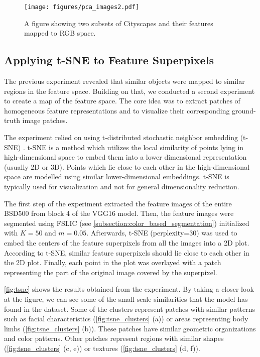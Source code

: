 \begin{figure}[htbp]
    \centering
    \texttt{[image: figures/pca\_images2.pdf]}
    \caption{A figure showing two subsets of Cityscapes and their features mapped to RGB space.}
    \label{fig:pca_images2}
\end{figure}

\subsection{Applying t-SNE to Feature Superpixels}

The previous experiment revealed that similar objects were mapped to similar regions in the feature space. Building on that, we conducted a second experiment to create a map of the feature space. The core idea was to extract patches of homogeneous feature representations and to visualize their corresponding ground-truth image patches.

The experiment relied on using t-distributed stochastic neighbor embedding (t-SNE) \parencite{van2008visualizing}. t-SNE is a method which utilizes the local similarity of points lying in high-dimensional space to embed them into a lower dimensional representation (usually 2D or 3D). Points which lie close to each other in the high-dimensional space are modelled using similar lower-dimensional embeddings. t-SNE is typically used for visualization and not for general dimensionality reduction.

The first step of the experiment extracted the feature images of the entire BSD500 from block 4 of the VGG16 model. Then, the feature images were segmented using FSLIC (see \autoref{subsection:color_based_segmentation}) initialized with $K=50$ and $m=0.05$. Afterwards, t-SNE (perplexity=30) was used to embed the centers of the feature superpixels from all the images into a 2D plot. According to t-SNE, similar feature superpixels should lie close to each other in the 2D plot. Finally, each point in the plot was overlayed with a patch representing the part of the original image covered by the superpixel.

\autoref{fig:tsne} shows the results obtained from the experiment. By taking a closer look at the figure, we can see some of the small-scale similarities that the model has found in the dataset. Some of the clusters represent patches with similar patterns such as facial characteristics (\autoref{fig:tsne_clusters} (a)) or areas representing body limbs (\autoref{fig:tsne_clusters} (b)). These patches have similar geometric organizations and color patterns. Other patches represent regions with similar shapes (\autoref{fig:tsne_clusters} (c, e)) or textures (\autoref{fig:tsne_clusters} (d, f)).

